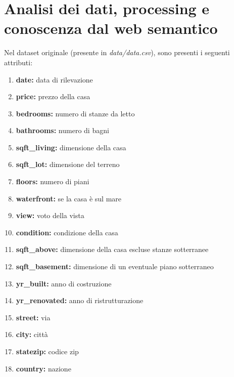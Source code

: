 \documentclass{article}
\begin{document}
\section{Analisi dei dati, processing e conoscenza dal web semantico}
Nel dataset originale (presente in \textit{data/data.csv}), sono presenti i
seguenti attributi:
\begin{enumerate}
	\itemsep0em
	\item \textbf{date:} data di rilevazione
	\item \textbf{price:} prezzo della casa
	\item \textbf{bedrooms:} numero di stanze da letto
	\item \textbf{bathrooms:} numero di bagni
	\item \textbf{sqft\_living:} dimensione della casa
	\item \textbf{sqft\_lot:} dimensione del terreno
	\item \textbf{floors:} numero di piani
	\item \textbf{waterfront:} se la casa è sul mare
	\item \textbf{view:} voto della vista
	\item \textbf{condition:} condizione della casa
	\item \textbf{sqft\_above:} dimensione della casa escluse stanze sotterranee
	\item \textbf{sqft\_basement:} dimensione di un eventuale piano sotterraneo
	\item \textbf{yr\_built:} anno di costruzione
	\item \textbf{yr\_renovated:} anno di ristrutturazione
	\item \textbf{street:} via
	\item \textbf{city:} città
	\item \textbf{statezip:} codice zip
	\item \textbf{country:} nazione
\end{enumerate}
\end{document}
